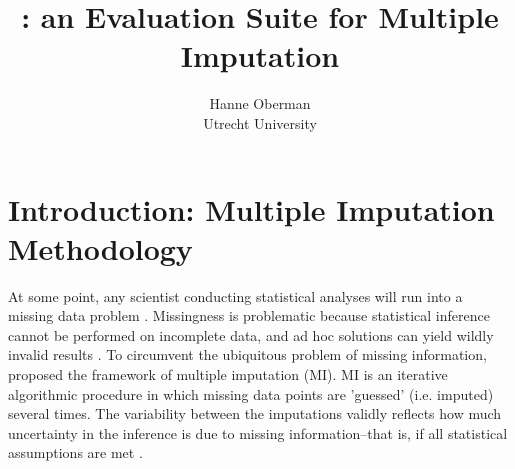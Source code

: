 \documentclass[article]{jss}
\author{Hanne Oberman\\Utrecht University}
\title{\pkg{ShinyMICE}: an Evaluation Suite for Multiple Imputation}
\newcommand{\fct}[1]{\code{#1()}}
\begin{document}


\section[Introduction: Multiple Imputation Methodology]{Introduction: Multiple Imputation Methodology} \label{sec:intro} %

% 

At some point, any scientist conducting statistical analyses will run into a missing data problem \citep{alli02}. Missingness is problematic because statistical inference cannot be performed on incomplete data, and  ad hoc solutions can yield wildly invalid results \citep{buur18}. To circumvent the ubiquitous problem of missing information, \cite{rubin87} proposed the framework of multiple imputation (MI). MI is an iterative algorithmic procedure in which missing data points are 'guessed' (i.e. imputed) several times. The variability between the imputations validly reflects how much uncertainty in the inference is due to missing information--that is, if all statistical assumptions are met \cite{rubin87}.
\end{document}

